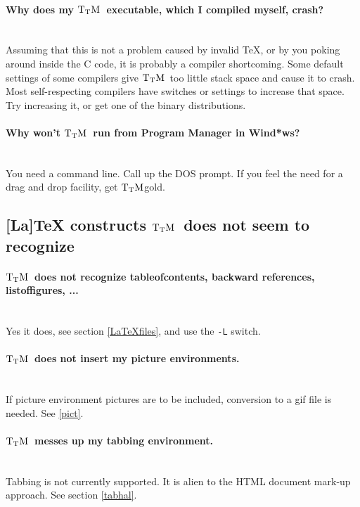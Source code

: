 \documentclass[12pt]{article}
\def\TtM{$\rm{}T_TH$}
\def\TtM{$\rm{}T_TM$}%
\def\TtMgold{\TtM{}gold}
\begin{document}
\paragraph{Why does my \TtM\ executable, which I compiled myself, crash?}
\leavevmode\\ Assuming that this is not a problem caused by invalid
\TeX, or by you poking around inside the C code, it is probably a
compiler shortcoming.  Some default settings of some compilers give
\TtM\ too little stack space and cause it to crash. Most
self-respecting compilers have switches or settings to increase that
space. Try increasing it, or get one of the binary distributions.

\paragraph{Why won't \TtM\ run from Program Manager in Wind*ws?}\leavevmode\\
You need a command line. Call up the DOS prompt. If you feel the need
for a drag and drop facility, get \TtMgold.


\subsection{[La]TeX constructs \TtM\ does not seem to recognize}

\paragraph{\TtM\ does not recognize tableofcontents, backward
references, listoffigures, ...}\leavevmode\\
Yes it does, see section \ref{LaTeXfiles}, and use the \verb+-L+ switch.

\paragraph{\TtM\ does not insert my picture environments.}\leavevmode\\
If picture environment pictures are to be included, conversion to a gif file
is needed. See \ref{pict}.

\paragraph{\TtM\ messes up my tabbing environment.}\leavevmode\\
Tabbing is not currently supported. It is alien to the HTML document
mark-up approach. See section \ref{tabhal}.
\end{document}
